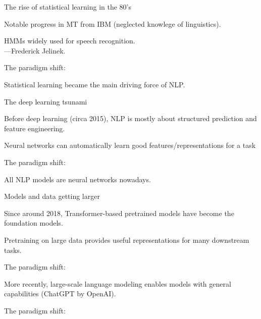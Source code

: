 \documentclass[usenames,dvipsnames,notes,11pt,aspectratio=169]{beamer}
\begin{document}
\begin{frame}
    {The rise of statistical learning in the 80's}
    \begin{wideitemize}
        \item Notable progress in MT from IBM (neglected knowlege of linguistics).
        \item HMMs widely used for speech recognition.\\[1ex]
            ---Frederick Jelinek.
        \item The paradigm shift: 
        \item Statistical learning became the main driving force of NLP.
    \end{wideitemize}
\end{frame}

\begin{frame}
    {The deep learning tsunami}
    \begin{wideitemize}
        \item Before deep learning (circa 2015), NLP is mostly about structured prediction and feature engineering.
        \item Neural networks can automatically learn good features/representations for a task 
        \item The paradigm shift: 
        \item All NLP models are neural networks nowadays.
    \end{wideitemize}
\end{frame}

\begin{frame}
    {Models and data getting larger}
    \begin{wideitemize}
        \item Since around 2018, Transformer-based pretrained models have become the foundation models. 
        \item Pretraining on large data provides useful representations for many downstream tasks.
        \item The paradigm shift: 
        \item More recently, large-scale language modeling enables models with general capabilities (\eg ChatGPT by OpenAI).
        \item The paradigm shift: 
    \end{wideitemize}
\end{frame}
\end{document}
